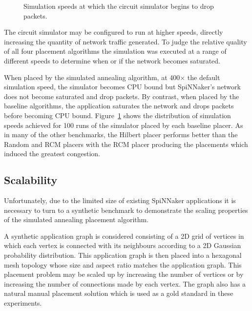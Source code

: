 				\begin{figure}
					\center
					
					\caption{Simulation speeds at which the circuit simulator begins to
					drop packets.}
					\label{fig:mu0-saturation}
				\end{figure}
				
				The circuit simulator may be configured to run at higher speeds,
				directly increasing the quantity of network traffic generated. To judge
				the relative quality of all four placement algorithms the simulation
				was executed at a range of different speeds to determine when or if the
				network becomes saturated.
				
				When placed by the simulated annealing algorithm, at 400$\times$ the
				default simulation speed, the simulator becomes CPU bound but
				SpiNNaker's network does not become saturated and drop packets. By
				contrast, when placed by the baseline algorithms, the application
				saturates the network and drops packets before becoming CPU bound.
				Figure~\ref{fig:mu0-saturation} shows the distribution of simulation
				speeds achieved for 100 runs of the simulator placed by each baseline
				placer. As in many of the other benchmarks, the Hilbert placer performs
				better than the Random and RCM placers with the RCM placer producing
				the placements which induced the greatest congestion.
			
		\subsection{Scalability}
			
			Unfortunately, due to the limited size of existing SpiNNaker applications
			it is necessary to turn to a synthetic benchmark to demonstrate the
			scaling properties of the simulated annealing placement algorithm.
			
			A synthetic application graph is considered consisting of a 2D grid of
			vertices in which each vertex is connected with its neighbours according
			to a 2D Gaussian probability distribution. This application graph is then
			placed into a hexagonal mesh topology whose size and aspect ratio matches
			the application graph. This placement problem may be scaled up by
			increasing the number of vertices or by increasing the number of
			connections made by each vertex. The graph also has a natural manual
			placement solution which is used as a gold standard in these experiments.
			
